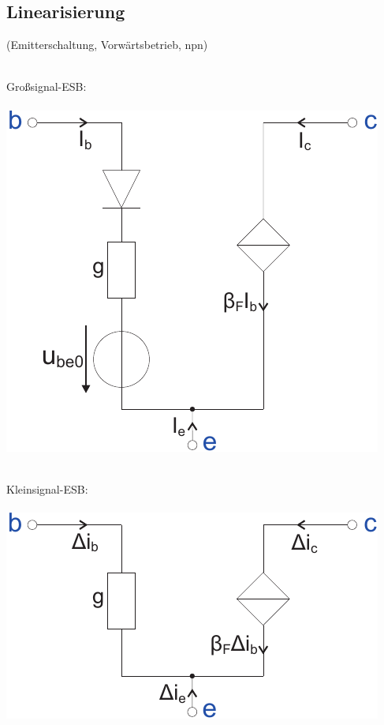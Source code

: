 \documentclass[a4paper,twocolumn,10pt]{article}
\begin{document}
\subsection*{Linearisierung}
(Emitterschaltung, Vorwärtsbetrieb, npn)\\\\
\begin{minipage}[t]{0.23\textwidth}
Großsignal-ESB:\\\\
\includegraphics[width=\textwidth]{img/Transistor_GSE}\\\\
\end{minipage}
\hfill
\begin{minipage}[t]{0.23\textwidth}
Kleinsignal-ESB:\\\\
\includegraphics[width=\textwidth]{img/Transistor_KSE}\\\\
\end{minipage}\\
\end{document}
